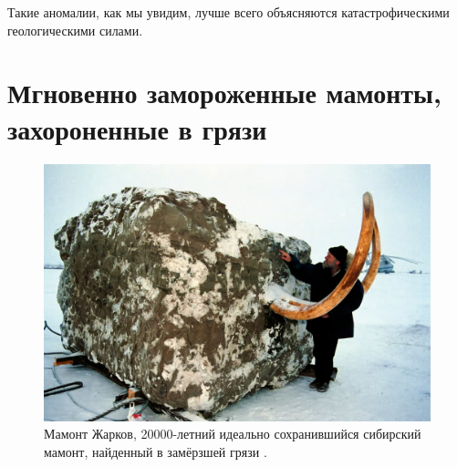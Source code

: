 \documentclass[10pt,twocolumn,letterpaper]{article}
\begin{document}
Такие аномалии, как мы увидим, лучше всего объясняются катастрофическими геологическими силами.

\section{Мгновенно замороженные мамонты, захороненные в грязи}

\begin{figure}[t]
\begin{center}
   \includegraphics[width=1\linewidth]{jarkov-mammoth.jpg}
\end{center}
   \caption{Мамонт Жарков, 20000-летний идеально сохранившийся сибирский мамонт, найденный в замёрзшей грязи \cite{51}.}
\label{fig:1}
\label{fig:onecol}
\end{figure}
\end{document}
